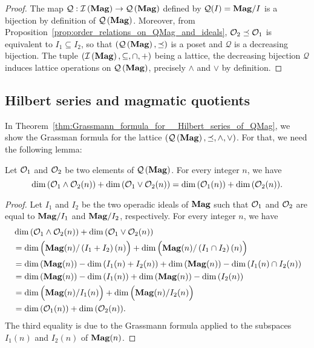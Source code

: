 \begin{proof}
  The map $\mathcal{Q}:\mathcal{I}\left(\mathbf{Mag}\right)\to\mathcal{Q}\left(\mathbf{Mag}\right)$ defined by $\mathcal{Q}(I)=\mathbf{Mag}/I$
  is a bijection by definition of $\mathcal{Q}\left(\mathbf{Mag}\right)$. Moreover, from
  Proposition~\ref{prop:order_relations_on_QMag_and_ideals},
  $\mathcal{O}_2\preceq\mathcal{O}_1$ is equivalent to $I_1\subseteq I_2$, so that
  $\left(\mathcal{Q}\left(\mathbf{Mag}\right),\preceq\right)$ is a poset and $\mathcal{Q}$ is a
  decreasing bijection. The tuple $\left(\mathcal{I}\left(\mathbf{Mag}\right),\subseteq,\cap,+\right)$
  being a lattice, the decreasing bijection $\mathcal{Q}$ induces
  lattice operations on $\mathcal{Q}\left(\mathbf{Mag}\right)$, precisely $\wedge$ and $\vee$ by
  definition.
\end{proof}


\subsection{Hilbert series and magmatic quotients}

In Theorem~\ref{thm:Grassmann_formula_for__Hilbert_series_of_QMag}, we show the Grassman formula for the lattice $\left(\mathcal{Q}\left(\mathbf{Mag}\right),\preceq,\wedge,\vee\right)$. For that, we need the following lemma:

\begin{Lemma} \label{lem:lattice_structure_and_coefficients_of_Hiblert_series}
  Let $\mathcal{O}_1$ and $\mathcal{O}_2$ be two elements of $\mathcal{Q}\left(\mathbf{Mag}\right)$. For every integer $n$, we have
  \begin{equation} \label{equ:lattice_structure_and_coefficients_of_the_Hiblert_series}
    \dim{\left(\mathcal{O}_1\wedge\mathcal{O}_2(n)\right)}+\dim{\left(\mathcal{O}_1\vee\mathcal{O}_2(n)\right)}=\dim{\left(\mathcal{O}_1(n)\right)}+\dim{\left(\mathcal{O}_2(n)\right)}.    \end{equation}
\end{Lemma}

\begin{proof}
  Let $I_1$ and $I_2$ be the two operadic ideals of $\mathbf{Mag}$ such that $\mathcal{O}_1$ and $\mathcal{O}_2$ are equal to $\mathbf{Mag}/I_1$ and $\mathbf{Mag}/I_2$, respectively. For every integer $n$, we have
  \[\begin{split}
  &\dim{\left(\mathcal{O}_1\wedge\mathcal{O}_2(n)\right)}+\dim{\left(\mathcal{O}_1\vee\mathcal{O}_2(n)\right)}\\
  &=\dim{\Big(\mathbf{Mag}(n)/\left(I_1+I_2\right)(n)\Big)}+\dim{\Big(\mathbf{Mag}(n)/\left(I_1\cap I_2\right)(n)\Big)}\\
  &=\dim{\left(\mathbf{Mag}(n)\right)}-\dim{\left(I_1(n)+I_2(n)\right)}+\dim{\left(\mathbf{Mag}(n)\right)}-\dim{\left(I_1(n)\cap I_2(n)\right)}\\
  &=\dim{\left(\mathbf{Mag}(n)\right)}-\dim{\left(I_1(n)\right)}+\dim{\left(\mathbf{Mag}(n)\right)}-\dim{\left(I_2(n)\right)}\\
  &=\dim{\Big(\mathbf{Mag}(n)/I_1(n)\Big)}+\dim{\Big(\mathbf{Mag}(n)/I_2(n)\Big)}\\
  &=\dim{\left(\mathcal{O}_1(n)\right)}+\dim{\left(\mathcal{O}_2(n)\right)}.
  \end{split}\]
  The third equality is due to the Grassmann formula applied to the subspaces $I_1(n)$ and $I_2(n)$ of $\mathbf{Mag}(n)$.
\end{proof}

